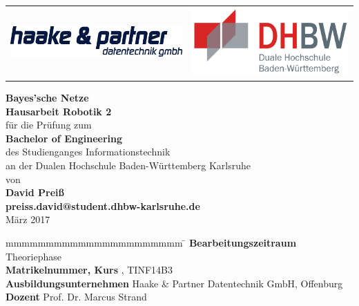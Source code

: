 \begin{titlepage}
	\begin{longtable}{p{} p{}}
		{\includegraphics[height=1.2cm]{bilder/logo}} &		
		{\includegraphics[height=2.6cm]{bilder/dhbw}}
	\end{longtable}
	\enlargethispage{20mm}
	\begin{center}
		\vspace*{12mm}	{\LARGE\bf Bayes'sche Netze  }\\
		\vspace*{12mm}	{\large\bf Hausarbeit Robotik 2}\\
		\vspace*{12mm}	für die Prüfung zum\\
		\vspace*{3mm}		{\bf Bachelor of Engineering}\\
    \vspace*{12mm}	des Studienganges Informationstechnik{} \\
    \vspace*{3mm}		an der Dualen Hochschule Baden-Württemberg Karlsruhe{} \\
		\vspace*{12mm}	von\\
		\vspace*{3mm}		{\large\bfseries David Preiß \\ preiss.david@student.dhbw-karlsruhe.de}\\ 
		\vspace*{12mm}	März 2017\\
	\end{center}
	\vfill
	\begin{spacing}{1.2}
	\begin{tabbing}
		mmmmmmmmmmmmmmmmmmmmmm            \= \kill
		\textbf{Bearbeitungszeitraum}       \>  Theoriephase\\
		\textbf{Matrikelnummer, Kurs}  , TINF14B3\\
		\textbf{Ausbildungsunternehmen}                  \>  Haake \& Partner Datentechnik GmbH, Offenburg\\
		\textbf{Dozent}               \>  Prof. Dr. Marcus Strand
	\end{tabbing}
	\end{spacing}
\end{titlepage}
